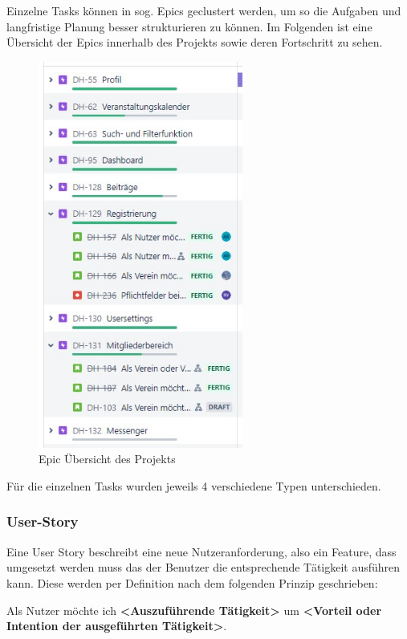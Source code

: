 Einzelne Tasks können in sog. Epics geclustert werden, um so die Aufgaben und langfristige Planung besser strukturieren zu können. Im Folgenden ist eine Übersicht der Epics innerhalb des Projekts sowie deren Fortschritt zu sehen.

\begin{figure}[ht!]
    \centering
    \includegraphics[width=0.6\textwidth]{figures/andre/epicsdesprojekts.jpg}
    \caption{Epic Übersicht des Projekts}
    \label{fig:epicsdesprojekts}
\end{figure}

Für die einzelnen Tasks wurden jeweils 4 verschiedene Typen unterschieden.

\subsubsection*{User-Story}
Eine User Story beschreibt eine neue Nutzeranforderung, also ein Feature, dass umgesetzt werden muss das der Benutzer die entsprechende Tätigkeit ausführen kann. Diese werden per Definition nach dem folgenden Prinzip geschrieben:

Als Nutzer möchte ich \textbf{<Auszuführende Tätigkeit>} um \textbf{<Vorteil oder Intention der ausgeführten Tätigkeit>}.

